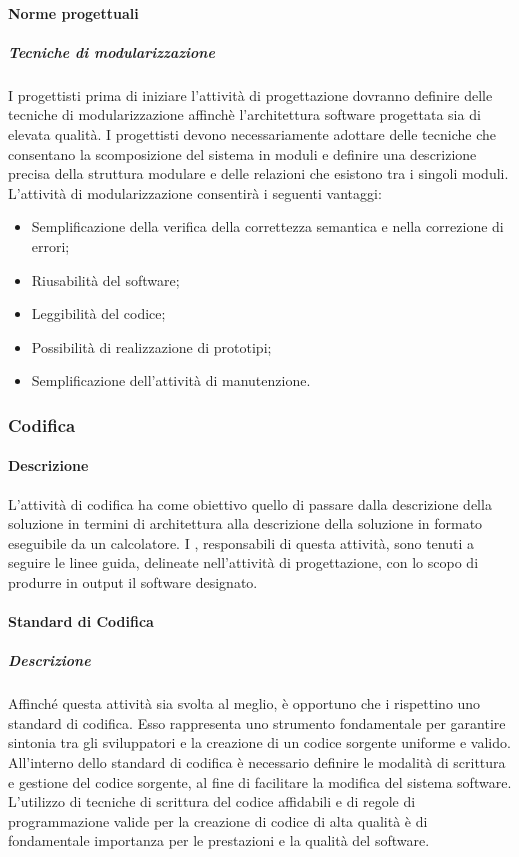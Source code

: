 \paragraph{Norme progettuali}
\subparagraph{Tecniche di modularizzazione}
I progettisti prima di iniziare l'attività di progettazione dovranno definire delle tecniche di modularizzazione affinchè l'architettura software progettata sia di elevata qualità.
I progettisti devono necessariamente adottare delle tecniche che consentano la scomposizione del sistema in moduli e definire una descrizione precisa della struttura modulare e delle relazioni che esistono tra i singoli moduli. 
L'attività di modularizzazione consentirà i seguenti vantaggi:
\begin{itemize}
\item
Semplificazione della verifica della correttezza semantica e nella correzione di errori;
\item
Riusabilità del software;
\item
Leggibilità del codice;
\item
Possibilità di realizzazione di prototipi;
\item
Semplificazione dell'attività di manutenzione.
\end{itemize}

\subsubsection{Codifica}

\paragraph{Descrizione}
L'attività di codifica ha come obiettivo quello di passare dalla descrizione della soluzione in termini di architettura alla descrizione della soluzione in formato eseguibile da un calcolatore. I \textit{\Progrs}, responsabili di questa attività, sono tenuti a seguire le linee guida, delineate nell'attività di progettazione, con lo scopo di produrre in output il software designato.

\paragraph{Standard di Codifica}
\subparagraph{Descrizione}
Affinché questa attività sia svolta al meglio, è opportuno che i \textit{\Progrs} rispettino uno standard di codifica.
Esso rappresenta uno strumento fondamentale per garantire sintonia tra gli sviluppatori e la creazione di un codice sorgente uniforme e valido.
All'interno dello standard di codifica è necessario definire le modalità di scrittura e gestione del codice sorgente, al fine di facilitare la modifica del sistema software.
L'utilizzo di tecniche di scrittura del codice affidabili e di regole di programmazione valide per la creazione di codice di alta qualità è di fondamentale importanza per le prestazioni e la qualità del software.


